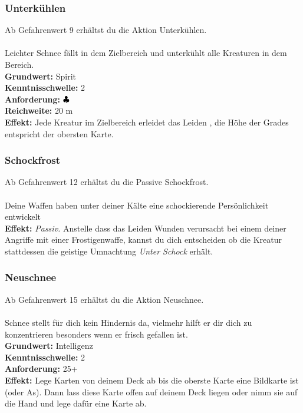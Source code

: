\subsubsection*{ Unterkühlen} \label{sk:unterkühlen}
Ab Gefahrenwert 9 erhältst du die Aktion Unterkühlen.\\
\\
Leichter Schnee fällt in dem Zielbereich und unterkühlt alle Kreaturen in dem Bereich.\\
\textbf{Grundwert:} Spirit \\
\textbf{Kenntnisschwelle:} 2 \\
\textbf{Anforderung:} ${\color{blue} }{\color{black}\clubsuit}$ \\
\textbf{Reichweite:} 20 m \\
\textbf{Effekt:} Jede Kreatur im Zielbereich erleidet das Leiden , die Höhe der Grades entspricht der obersten Karte.

\subsubsection*{ Schockfrost} \label{sk:schockfrost}
Ab Gefahrenwert 12 erhältst du die Passive Schockfrost.\\
\\
Deine Waffen haben unter deiner Kälte eine schockierende Persönlichkeit entwickelt\\
\textbf{Effekt:} \textit{Passiv.} Anstelle dass das Leiden  Wunden verursacht bei einem deiner Angriffe mit einer Frostigenwaffe, kannst du dich entscheiden ob die Kreatur stattdessen die geistige Umnachtung \textit{Unter Schock} erhält.

\subsubsection*{ Neuschnee} \label{sk:neuschnee}
Ab Gefahrenwert 15 erhältst du die Aktion Neuschnee.\\
\\
Schnee stellt für dich kein Hindernis da, vielmehr hilft er dir dich zu konzentrieren besonders wenn er frisch gefallen ist.\\
\textbf{Grundwert:} Intelligenz \\
\textbf{Kenntnisschwelle:} 2 \\
\textbf{Anforderung:} 25+ \\
\textbf{Effekt:} Lege Karten von deinem Deck ab bis die oberste Karte eine Bildkarte ist (oder As). Dann lass diese Karte offen auf deinem Deck liegen oder nimm sie auf die Hand und lege dafür eine Karte ab.

